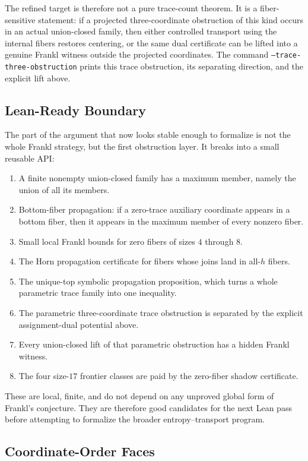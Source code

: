 \documentclass[11pt]{article}
\begin{document}
The refined target is therefore not a pure trace-count theorem.  It is a
fiber-sensitive statement: if a projected three-coordinate obstruction of
this kind occurs in an actual union-closed family, then either controlled
transport using the internal fibers restores centering, or the same dual
certificate can be lifted into a genuine Frankl witness outside the projected
coordinates.  The command \texttt{--trace-three-obstruction} prints this
trace obstruction, its separating direction, and the explicit lift above.

\subsection{Lean-Ready Boundary}

The part of the argument that now looks stable enough to formalize is not the
whole Frankl strategy, but the first obstruction layer.  It breaks into a
small reusable API:
\begin{enumerate}
  \item A finite nonempty union-closed family has a maximum member, namely the
  union of all its members.
  \item Bottom-fiber propagation: if a zero-trace auxiliary coordinate appears
  in a bottom fiber, then it appears in the maximum member of every nonzero
  fiber.
  \item Small local Frankl bounds for zero fibers of sizes $4$ through $8$.
  \item The Horn propagation certificate for fibers whose joins land in
  all-$h$ fibers.
  \item The unique-top symbolic propagation proposition, which turns a whole
  parametric trace family into one inequality.
  \item The parametric three-coordinate trace obstruction is separated by the
  explicit assignment-dual potential above.
  \item Every union-closed lift of that parametric obstruction has a hidden
  Frankl witness.
  \item The four size-$17$ frontier classes are paid by the zero-fiber shadow
  certificate.
\end{enumerate}
These are local, finite, and do not depend on any unproved global form of
Frankl's conjecture.  They are therefore good candidates for the next Lean
pass before attempting to formalize the broader entropy--transport program.

\subsection{Coordinate-Order Faces}
\end{document}

